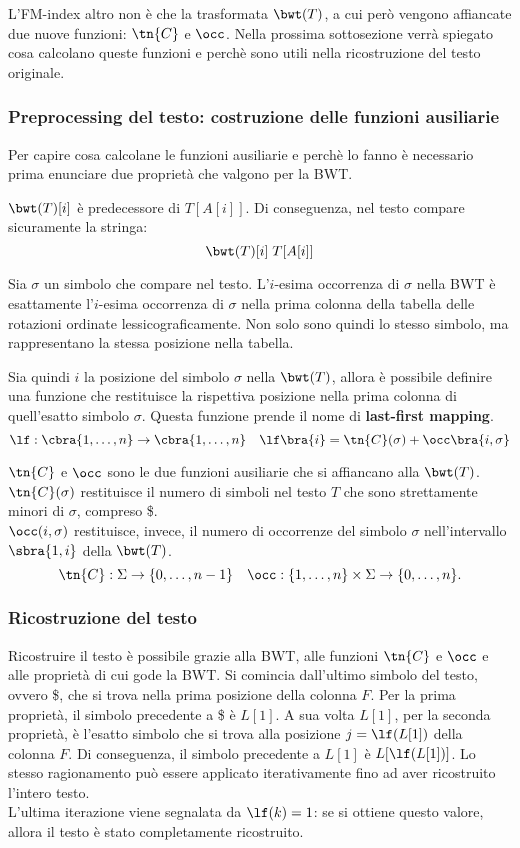 L'FM-index altro non è che la trasformata $\bwt(T)$, a cui però vengono affiancate due nuove funzioni: $\tn{C}$ e $\occ$.
Nella prossima sottosezione verrà spiegato cosa calcolano queste funzioni e perchè sono utili nella ricostruzione del testo originale.

\subsubsection{Preprocessing del testo: costruzione delle funzioni ausiliarie}
Per capire cosa calcolane le funzioni ausiliarie e perchè lo fanno è necessario prima enunciare due proprietà che valgono per la BWT.\\
\begin{property}
    $\bwt(T)[i]$ è predecessore di $T[A[i]]$. Di conseguenza, nel testo compare sicuramente la stringa:
    \[
        \bwt(T)[i] \; T[A[i]]
    \]
\end{property}
\begin{property}
    Sia $\sigma$ un simbolo che compare nel testo. L'$i$-esima occorrenza di $\sigma$ nella BWT è esattamente l'$i$-esima occorrenza di $\sigma$ nella prima colonna della tabella delle rotazioni ordinate lessicograficamente.
    Non solo sono quindi lo stesso simbolo, ma rappresentano la stessa posizione nella tabella.
\end{property}
Sia quindi $i$ la posizione del simbolo $\sigma$ nella $\bwt(T)$, allora è possibile definire una funzione che restituisce la rispettiva posizione nella prima colonna di quell'esatto simbolo $\sigma$. Questa funzione prende il nome di \textbf{last-first mapping}.
\[
    \lf: \cbra{1, \ldots, n} \rightarrow \cbra{1, \ldots, n} \quad \lf \bra{i} = \tn{C}(\sigma) + \occ \bra{i, \sigma}
\]

$\tn{C}$ e $\occ$ sono le due funzioni ausiliarie che si affiancano alla $\bwt(T)$.\\
$\tn{C}(\sigma)$ restituisce il numero di simboli nel testo $T$ che sono strettamente minori di $\sigma$, compreso \$.\\
$\occ (i, \sigma)$ restituisce, invece, il numero di occorrenze del simbolo $\sigma$ nell'intervallo $\sbra{1, i}$ della $\bwt(T)$.
\[
\tn{C}: \Sigma \rightarrow \{ 0, \ldots, n-1 \} \quad \occ: \{ 1, \ldots, n \} \times \Sigma \rightarrow \{ 0, \ldots, n \}.
\]

\subsubsection{Ricostruzione del testo}
Ricostruire il testo è possibile grazie alla BWT, alle funzioni $\tn{C}$ e $\occ$ e alle proprietà di cui gode la BWT.
Si comincia dall'ultimo simbolo del testo, ovvero \$, che si trova nella prima posizione della colonna $F$. 
Per la prima proprietà, il simbolo precedente a \$ è $L[1]$.
A sua volta $L[1]$, per la seconda proprietà, è l'esatto simbolo che si trova alla posizione $j = \lf(L[1])$ della colonna $F$. Di conseguenza, il simbolo precedente a $L[1]$ è $L[\lf(L[1])]$.
Lo stesso ragionamento può essere applicato iterativamente fino ad aver ricostruito l'intero testo.\\
L'ultima iterazione viene segnalata da $\lf(k) = 1$: se si ottiene questo valore, allora il testo è stato completamente ricostruito.